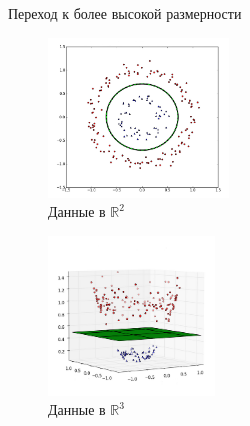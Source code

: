 \documentclass[12pt]{beamer}
\begin{document}
\begin{frame}{Переход к более высокой размерности}
	\begin{figure}[htbp]
		\begin{minipage}{.5\textwidth}
		  \includegraphics[height=120pt, keepaspectratio = true]{images/data-r2-1} \\
			\centering Данные в $\mathbb{R}^2$
	    \end{minipage}%
	    \begin{minipage}{.5\textwidth}
			\includegraphics[height=120pt, keepaspectratio = true]{images/data-r3-1}   \\
			\centering Данные в $\mathbb{R}^3$
		\end{minipage}%
	
	\end{figure}
\end{frame}
\end{document}

